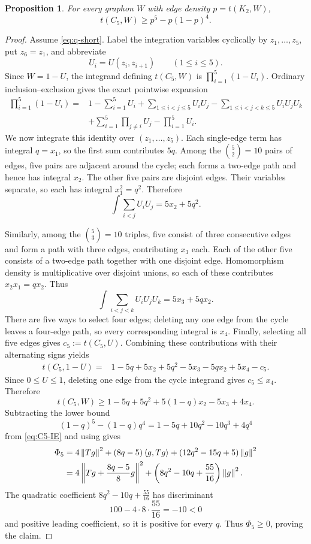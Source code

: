 \documentclass[11pt]{article}
\newtheorem{proposition}[theorem]{Proposition}
\numberwithin{equation}{section}
\newcommand{\ip}[2]{\left\langle #1,#2\right\rangle}
\newcommand{\norm}[1]{\left\lVert #1\right\rVert}
\begin{document}
\begin{proposition}\label{prop:C5}
  For every graphon $W$ with edge density $p=t(K_2,W)$,
  \[
    t(C_5,W)\ge p^5-p(1-p)^4.
  \]
\end{proposition}

\begin{proof}
  Assume \eqref{eq:q-short}.
  Label the integration variables cyclically by $z_1,\ldots,z_5$, put $z_6=z_1$, and abbreviate
  \[
    U_i=U(z_i,z_{i+1})\qquad(1\le i\le5).
  \]
  Since $W=1-U$, the integrand defining $t(C_5,W)$ is $\prod_{i=1}^5(1-U_i)$.
  Ordinary inclusion--exclusion gives the exact pointwise expansion
  \begin{align*}
    \prod_{i=1}^5(1-U_i)
    ={}&1-\sum_{i=1}^5U_i
    +\sum_{1\le i<j\le5}U_iU_j
    -\sum_{1\le i<j<k\le5}U_iU_jU_k\\
    &+\sum_{i=1}^5\prod_{j\ne i}U_j
    -\prod_{i=1}^5U_i.
  \end{align*}
  We now integrate this identity over $(z_1,\ldots,z_5)$.
  Each single-edge term has integral $q=x_1$, so the first sum contributes $5q$.
  Among the $\binom52=10$ pairs of edges, five pairs are adjacent around the cycle; each forms a two-edge path and hence has integral $x_2$.
  The other five pairs are disjoint edges.
  Their variables separate, so each has integral $x_1^2=q^2$.
  Therefore
  \[
    \int\sum_{i<j}U_iU_j=5x_2+5q^2.
  \]

  Similarly, among the $\binom53=10$ triples, five consist of three consecutive edges and form a path with three edges, contributing $x_3$ each.
  Each of the other five consists of a two-edge path together with one disjoint edge.
  Homomorphism density is multiplicative over disjoint unions, so each of these contributes $x_2x_1=qx_2$.
  Thus
  \[
    \int\sum_{i<j<k}U_iU_jU_k=5x_3+5qx_2.
  \]
  There are five ways to select four edges; deleting any one edge from the cycle leaves a four-edge path, so every corresponding integral is $x_4$.
  Finally, selecting all five edges gives $c_5:=t(C_5,U)$.
  Combining these contributions with their alternating signs yields
  \begin{align*}
    t(C_5,1-U)
    ={}&1-5q+5x_2+5q^2-5x_3-5qx_2+5x_4-c_5.
  \end{align*}
  Since $0\le U\le1$, deleting one edge from the cycle integrand gives $c_5\le x_4$.
  Therefore
  \begin{equation}\label{eq:C5-IE}
    t(C_5,W)\ge1-5q+5q^2+5(1-q)x_2-5x_3+4x_4.
  \end{equation}
  Subtracting the lower bound
  \[
    (1-q)^5-(1-q)q^4=1-5q+10q^2-10q^3+4q^4
  \]
  from \eqref{eq:C5-IE} and using  gives
  \begin{align}
    \Phi_5={}&4\norm{Tg}^2+(8q-5)\ip g{Tg}
    +(12q^2-15q+5)\norm g^2 \notag\\
    ={}&4\left\|Tg+\frac{8q-5}{8}g\right\|^2
    +\left(8q^2-10q+\frac{55}{16}\right)\norm g^2. \label{eq:Phi5}
  \end{align}
  The quadratic coefficient $8q^2-10q+\frac{55}{16}$ has discriminant
  \[
    100-4\cdot8\cdot\frac{55}{16}=-10<0
  \]
  and positive leading coefficient, so it is positive for every $q$.
  Thus $\Phi_5\ge0$, proving the claim.
\end{proof}
\end{document}
